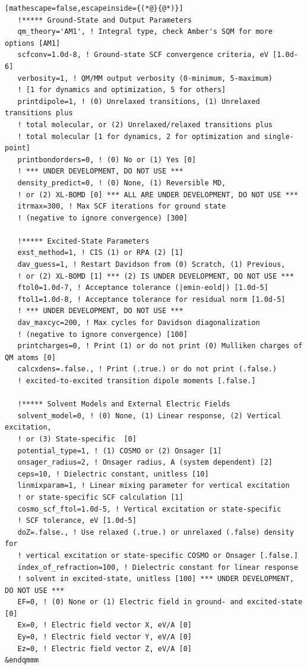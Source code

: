 \documentclass[letterpaper,12pt,titlepage]{article}
\begin{document}
\begin{appendix}
\begin{lstlisting}[mathescape=false,escapeinside={(*@}{@*)}]
   !***** Ground-State and Output Parameters
   qm_theory='AM1', ! Integral type, check Amber's SQM for more options [AM1]
   scfconv=1.0d-8, ! Ground-state SCF convergence criteria, eV [1.0d-6]
   verbosity=1, ! QM/MM output verbosity (0-minimum, 5-maximum)
   ! [1 for dynamics and optimization, 5 for others]
   printdipole=1, ! (0) Unrelaxed transitions, (1) Unrelaxed transitions plus 
   ! total molecular, or (2) Unrelaxed/relaxed transitions plus 
   ! total molecular [1 for dynamics, 2 for optimization and single-point]
   printbondorders=0, ! (0) No or (1) Yes [0]
   ! *** UNDER DEVELOPMENT, DO NOT USE ***
   density_predict=0, ! (0) None, (1) Reversible MD, 
   ! or (2) XL-BOMD [0] *** ALL ARE UNDER DEVELOPMENT, DO NOT USE ***
   itrmax=300, ! Max SCF iterations for ground state 
   ! (negative to ignore convergence) [300]

   !***** Excited-State Parameters
   exst_method=1, ! CIS (1) or RPA (2) [1]
   dav_guess=1, ! Restart Davidson from (0) Scratch, (1) Previous, 
   ! or (2) XL-BOMD [1] *** (2) IS UNDER DEVELOPMENT, DO NOT USE ***
   ftol0=1.0d-7, ! Acceptance tolerance (|emin-eold|) [1.0d-5]
   ftol1=1.0d-8, ! Acceptance tolerance for residual norm [1.0d-5] 
   ! *** UNDER DEVELOPMENT, DO NOT USE ***
   dav_maxcyc=200, ! Max cycles for Davidson diagonalization 
   ! (negative to ignore convergence) [100]
   printcharges=0, ! Print (1) or do not print (0) Mulliken charges of QM atoms [0]
   calcxdens=.false., ! Print (.true.) or do not print (.false.) 
   ! excited-to-excited transition dipole moments [.false.]

   !***** Solvent Models and External Electric Fields
   solvent_model=0, ! (0) None, (1) Linear response, (2) Vertical excitation, 
   ! or (3) State-specific  [0]
   potential_type=1, ! (1) COSMO or (2) Onsager [1]
   onsager_radius=2, ! Onsager radius, A (system dependent) [2]
   ceps=10, ! Dielectric constant, unitless [10]
   linmixparam=1, ! Linear mixing parameter for vertical excitation
   ! or state-specific SCF calculation [1]
   cosmo_scf_ftol=1.0d-5, ! Vertical excitation or state-specific
   ! SCF tolerance, eV [1.0d-5]
   doZ=.false., ! Use relaxed (.true.) or unrelaxed (.false) density for 
   ! vertical excitation or state-specific COSMO or Onsager [.false.]
   index_of_refraction=100, ! Dielectric constant for linear response 
   ! solvent in excited-state, unitless [100] *** UNDER DEVELOPMENT, DO NOT USE ***
   EF=0, ! (0) None or (1) Electric field in ground- and excited-state [0]
   Ex=0, ! Electric field vector X, eV/A [0]
   Ey=0, ! Electric field vector Y, eV/A [0]
   Ez=0, ! Electric field vector Z, eV/A [0] 
&endqmmm


\end{lstlisting}
\end{appendix}
\end{document}
